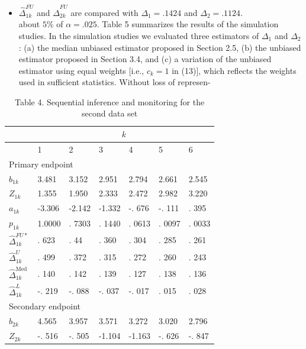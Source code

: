\documentclass[10pt]{article}
\begin{document}
\begin{itemize}
  \item $\hat{\Delta}_{1 k}^{F U}$ and $\hat{\Delta}_{2 k}^{F U}$ are compared with $\Delta_{1}=.1424$ and $\Delta_{2}=.1124$.\\
about $5 \%$ of $\alpha=.025$. Table 5 summarizes the results of the simulation studies. In the simulation studies we evaluated three estimators of $\Delta_{1}$ and $\Delta_{2}$ : (a) the median unbiased estimator proposed in Section 2.5, (b) the unbiased estimator proposed in Section 3.4, and (c) a variation of the unbiased estimator using equal weights [i.e., $c_{k}=1$ in (13)], which reflects the weights used in sufficient statistics. Without loss of represen-
\end{itemize}

\begin{table}[h]
\begin{center}
\captionsetup{labelformat=empty}
\caption{Table 4. Sequential inference and monitoring for the second data set}
\begin{tabular}[t]{|l|l|l|l|l|l|l|}
\hline
\multirow{2}{*}{} & \multicolumn{6}{|c|}{$k$} \\
\hline
 & 1 & 2 & 3 & 4 & 5 & 6 \\
\hline
\multicolumn{7}{|l|}{Primary endpoint} \\
\hline
$b_{1 k}$ & 3.481 & 3.152 & 2.951 & 2.794 & 2.661 & 2.545 \\
\hline
$Z_{1 k}$ & 1.355 & 1.950 & 2.333 & 2.472 & 2.982 & 3.220 \\
\hline
$a_{1 k}$ & -3.306 & -2.142 & -1.332 & -. 676 & -. 111 & . 395 \\
\hline
$p_{1 k}$ & 1.0000 & . 7303 & . 1440 & . 0613 & . 0097 & . 0033 \\
\hline
$\hat{\Delta}_{1 k}^{F U *}$ & . 623 & . 44 & . 360 & . 304 & . 285 & . 261 \\
\hline
$\hat{\Delta}_{1 k}^{U}$ & . 499 & . 372 & . 315 & . 272 & . 260 & . 243 \\
\hline
$\hat{\Delta}_{1 k}^{\text {Med }}$ & . 140 & . 142 & . 139 & . 127 & . 138 & . 136 \\
\hline
$\hat{\Delta}_{1 k}^{L}$ & -. 219 & -. 088 & -. 037 & -. 017 & . 015 & . 028 \\
\hline
\multicolumn{7}{|l|}{Secondary endpoint} \\
\hline
$b_{2 k}$ & 4.565 & 3.957 & 3.571 & 3.272 & 3.020 & 2.796 \\
\hline
$Z_{2 k}$ & -. 516 & -. 505 & -1.104 & -1.163 & -. 626 & -. 847 \\

\end{tabular}
\end{center}
\end{table}
\end{document}
